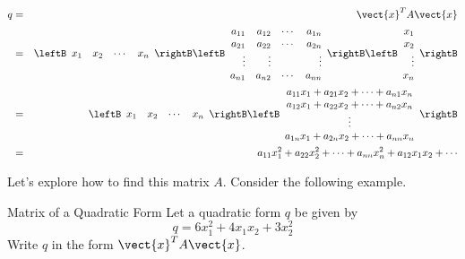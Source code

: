 \begin{eqnarray*}
q &=& \vect{x}^T A \vect{x} \\
&=& \leftB \begin{array}{rrrr}
x_1 & x_2 & \cdots & x_n
\end{array} \rightB 
 \leftB
\begin{array}{rrrr}
a_{11} & a_{12} & \cdots & a_{1n} \\
a_{21} & a_{22} & \cdots & a_{2n} \\
\vdots & \vdots & & \vdots \\
a_{n1} & a_{n2} & \cdots & a_{nn}
\end{array}
\rightB
\leftB \begin{array}{r}
x_1 \\
x_2 \\
\vdots \\
x_n 
\end{array}
\rightB \\
&=& 
\leftB \begin{array}{rrrr}
x_1 & x_2 & \cdots & x_n
\end{array} \rightB 
\leftB
\begin{array}{c}
a_{11}x_1 + a_{21}x_2 + \cdots + a_{n1}x_n \\
a_{12}x_1 + a_{22}x_2 + \cdots + a_{n2}x_n \\
\vdots \\
a_{1n}x_1 + a_{2n}x_2 + \cdots + a_{nn}x_n
\end{array}
\rightB \\
&=& a_{11}x_1^2 + a_{22}x_2^2 + \cdots + a_{nn}x_n^2 + a_{12}x_1x_2 + \cdots
\end{eqnarray*}

Let's explore how to find this matrix $A$. Consider the following example.

\begin{example}{Matrix of a Quadratic Form}\label{exa:matrixquadraticform}
Let a quadratic form $q$ be given by 
\[
q = 6x_1^2 + 4x_1x_2 + 3x_2^2
\]
Write $q$ in the form $\vect{x}^TA\vect{x}$. 
\end{example}

